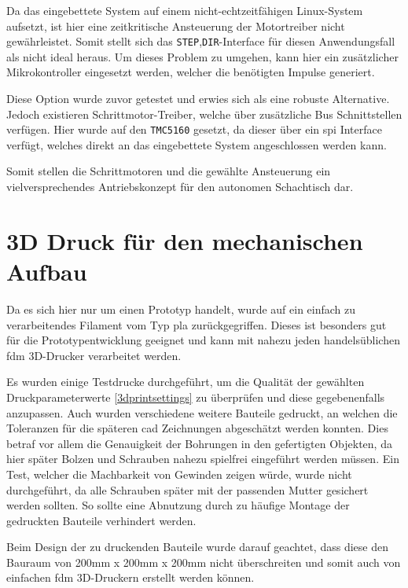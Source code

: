 Da das eingebettete System auf einem nicht-echtzeitfähigen Linux-System
aufsetzt, ist hier eine zeitkritische Ansteuerung der Motortreiber nicht
gewährleistet. Somit stellt sich das
\passthrough{\lstinline!STEP!},\passthrough{\lstinline!DIR!}-Interface
für diesen Anwendungsfall als nicht ideal heraus. Um dieses Problem zu
umgehen, kann hier ein zusätzlicher Mikrokontroller eingesetzt werden,
welcher die benötigten Impulse generiert.

Diese Option wurde zuvor getestet und erwies sich als eine robuste
Alternative. Jedoch existieren Schrittmotor-Treiber, welche über
zusätzliche Bus Schnittstellen verfügen. Hier wurde auf den
\passthrough{\lstinline!TMC5160!} gesetzt, da dieser über ein \gls{spi}
Interface verfügt, welches direkt an das eingebettete System
angeschlossen werden kann.

Somit stellen die Schrittmotoren und die gewählte Ansteuerung ein
vielversprechendes Antriebskonzept für den autonomen Schachtisch dar.

\hypertarget{d-druck-fuxfcr-den-mechanischen-aufbau}{%
\section{3D Druck für den mechanischen
Aufbau}\label{d-druck-fuxfcr-den-mechanischen-aufbau}}

Da es sich hier nur um einen Prototyp handelt, wurde auf ein einfach zu
verarbeitendes Filament vom Typ \gls{pla} zurückgegriffen. Dieses ist
besonders gut für die Prototypentwicklung geeignet und kann mit nahezu
jeden handelsüblichen \gls{fdm} 3D-Drucker verarbeitet werden.

Es wurden einige Testdrucke durchgeführt, um die Qualität der gewählten
Druckparameterwerte \ref{3dprintsettings} zu überprüfen und diese
gegebenenfalls anzupassen. Auch wurden verschiedene weitere Bauteile
gedruckt, an welchen die Toleranzen für die späteren \gls{cad}
Zeichnungen abgeschätzt werden konnten. Dies betraf vor allem die
Genauigkeit der Bohrungen in den gefertigten Objekten, da hier später
Bolzen und Schrauben nahezu spielfrei eingeführt werden müssen. Ein
Test, welcher die Machbarkeit von Gewinden zeigen würde, wurde nicht
durchgeführt, da alle Schrauben später mit der passenden Mutter
gesichert werden sollten. So sollte eine Abnutzung durch zu häufige
Montage der gedruckten Bauteile verhindert werden.

Beim Design der zu druckenden Bauteile wurde darauf geachtet, dass diese
den Bauraum von 200mm x 200mm x 200mm nicht überschreiten und somit auch
von einfachen \gls{fdm} 3D-Druckern erstellt werden können.


